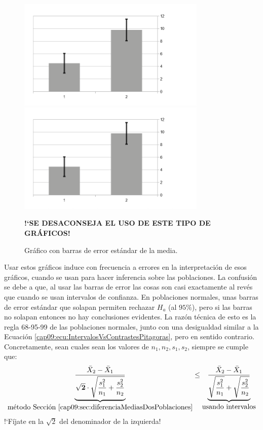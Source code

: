 \begin{figure}[ht]
\begin{center}
\begin{enColor}
\includegraphics[width=9cm]{../fig/Cap09-GraficoConBarrasDeError-bn.png}
\end{enColor}
\begin{bn}
\includegraphics[width=9cm]{../fig/Cap09-GraficoConBarrasDeError-bn.png}
\end{bn}
\caption{Gráfico con barras de error estándar de la media.}
{\bf {!`}SE DESACONSEJA EL USO DE ESTE TIPO DE GRÁFICOS!}
\label{cap09:fig:GraficoBarrasError}
\end{center}
\end{figure}

Usar estos gráficos induce con frecuencia a errores en la interpretación de esos gráficos, cuando
se usan para hacer inferencia sobre las poblaciones. La confusión se debe a que, al usar las barras
de error las cosas son casi exactamente al revés que cuando se usan intervalos de confianza. En
poblaciones normales, unas barras de error estándar que solapan permiten rechazar $H_a$ (al
$95\%$), pero si las barras no solapan entonces no hay conclusiones evidentes. La razón técnica de
esto es la regla 68-95-99 de las poblaciones normales, junto con una desigualdad similar a la
Ecuación \ref{cap09:ecu:IntervalosVsContrastesPitagoras}, pero en sentido contrario. Concretamente,
sean cuales sean los valores de $n_1, n_2, s_1, s_2$, siempre se cumple que:
\begin{equation}
\label{cap09:ecu:IntervalosVsContrastesPitagorasAlReves}
\underbrace{\dfrac{\bar X_2 - \bar X_1}{\mathbf{\sqrt{2}}\cdot\sqrt{\dfrac{s_1^2}{n_1}+\dfrac{s_2^2}{n_2}}}}
_{
\mbox{método Sección \ref{cap09:sec:diferenciaMediasDosPoblaciones}}
}
\leq
\underbrace{
\dfrac{\bar X_2 - \bar X_1}{\sqrt{\dfrac{s_1^2}{n_1}} + \sqrt{\dfrac{s_2^2}{n_2}}}}
_{
\mbox{usando intervalos}
}
\end{equation}
{!`}Fíjate en la $\sqrt{2}$ del denominador de la izquierda!



